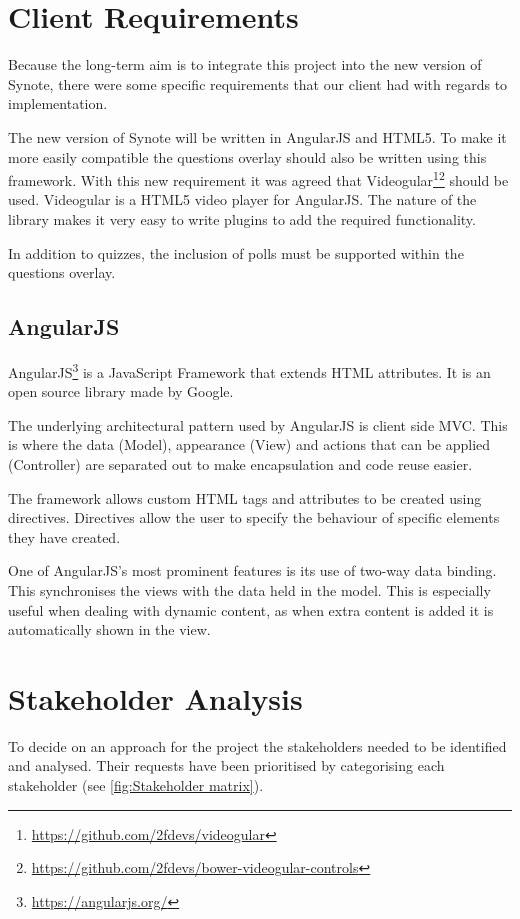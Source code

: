 \section{Client Requirements}
Because the long-term aim is to integrate this project into the new version of Synote, there were some specific requirements that our client had with regards to implementation.

The new version of Synote will be written in \gls{AngularJS} and \gls{HTML5}. To make it more easily compatible the questions overlay should also be written using this framework. With this new requirement it was agreed that \gls{Videogular}\footnote{\url{https://github.com/2fdevs/videogular}}\footnote{\url{https://github.com/2fdevs/bower-videogular-controls}} should be used. \gls{Videogular} is a \gls{HTML5} video player for \gls{AngularJS}. The nature of the library makes it very easy to write plugins to add the required functionality.

In addition to quizzes, the inclusion of polls must be supported within the questions overlay.

\subsection{AngularJS}
\label{Section:AngularJS}

\gls{AngularJS}\footnote{\url{https://angularjs.org/}} is a JavaScript Framework that extends HTML attributes. It is an open source library made by Google.

The underlying architectural pattern used by \gls{AngularJS} is client side \gls{MVC}. This is where the data (Model), appearance (View) and actions that can be applied (Controller) are separated out to make encapsulation and code reuse easier.

The framework allows custom HTML tags and attributes to be created using directives. Directives allow the user to specify the behaviour of specific elements they have created.

One of \gls{AngularJS}'s most prominent features is its use of two-way data binding. This synchronises the views with the data held in the model. This is especially useful when dealing with dynamic content, as when extra content is added it is automatically shown in the view.

\section{Stakeholder Analysis}
To decide on an approach for the project the stakeholders needed to be identified and analysed. Their requests have been prioritised by categorising each stakeholder (see \autoref{fig:Stakeholder matrix}).

